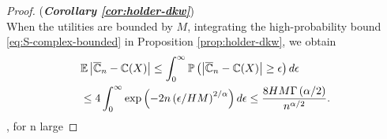\begin{proof}(\textbf{\textit{Corollary \ref{cor:holder-dkw}}})\ \\
 When the utilities are bounded by $M$, integrating the high-probability bound \eqref{eq:S-complex-bounded} in Proposition \ref{prop:holder-dkw}, we obtain
 \begin{align*}
& \mathbb{E} \left|\overline {\mathbb{C}}_n- \mathbb{C}(X) \right|  
  \le \int_0^{\infty} \mathbb{P}\left( \left|\overline {\mathbb{C}}_n- \mathbb{C}(X) \right| \geq  \epsilon \right) d\epsilon\\
  &\le 4 \int_0^{\infty} \exp\left(-2n\left(\epsilon/HM\right)^{2/\alpha}\right) d\epsilon \le \frac{8HM \Gamma\left(\alpha/2\right)}{n^{\alpha/2}}.
 \end{align*}
, for n large 
\end{proof}


